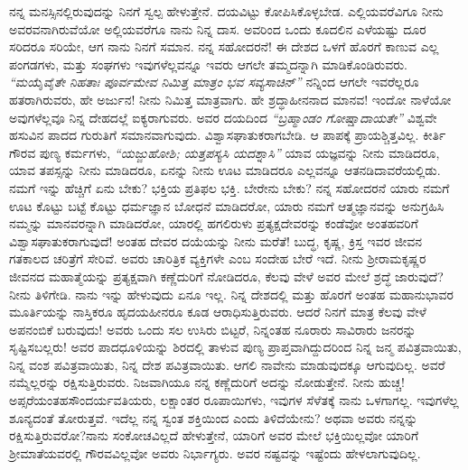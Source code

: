 ನನ್ನ ಮನಸ್ಸಿನಲ್ಲಿರುವುದನ್ನು ನಿನಗೆ ಸ್ವಲ್ಪ ಹೇಳುತ್ತೇನೆ. ದಯವಿಟ್ಟು ಕೋಪಿಸಿಕೊಳ್ಳಬೇಡ. ಎಲ್ಲಿಯವರೆವಿಗೂ ನೀನು ಅವರವನಾಗಿರುವೆಯೋ ಅಲ್ಲಿಯವರೆಗೂ ನಾನು ನಿನ್ನ ದಾಸ. ಅವರಿಂದ ಒಂದು ಕೂದಲಿನ ಎಳೆಯಷ್ಟು ದೂರ ಸರಿದರೂ ಸರಿಯೇ, ಆಗ ನಾನು ನಿನಗೆ ಸಮಾನ. ನನ್ನ ಸಹೋದರನೆ! ಈ ದೇಶದ ಒಳಗೆ ಹೊರಗೆ ಕಾಣುವ ಎಲ್ಲ ಪಂಗಡಗಳು, ಮತ್ತು ಸಂಘಗಳು ಇವುಗಳೆಲ್ಲವನ್ನೂ ಇವರು ಆಗಲೇ ತಮ್ಮದನ್ನಾಗಿ ಮಾಡಿಕೊಂಡಿರುವರು. \textit{ “ಮಯೈವೈತೇ ನಿಹತಾಃ ಪೂರ್ವಮೇವ ನಿಮಿತ್ತ ಮಾತ್ರಂ ಭವ ಸವ್ಯಸಾಚಿನ್” }\enginline{-} ನನ್ನಿಂದ ಆಗಲೇ ಇವರೆಲ್ಲರೂ ಹತರಾಗಿರುವರು, ಹೇ ಅರ್ಜುನ! ನೀನು ನಿಮಿತ್ತ ಮಾತ್ರವಾಗು. ಹೇ ಶ್ರದ್ಧಾಹೀನನಾದ ಮಾನವ! ಇಂದೋ ನಾಳೆಯೋ ಅವುಗಳೆಲ್ಲವೂ ನಿನ್ನ ದೇಹದಲ್ಲೆ ಐಕ್ಯರಾಗುವರು. ಅವರ ದಯದಿಂದ \textit{ “ಬ್ರಹ್ಮಾಂಡಂ ಗೋಷ್ಷಾದಾಯತೇ” } \enginline{-} ವಿಶ್ವವೇ ಹಸುವಿನ ಪಾದದ ಗುರುತಿಗೆ ಸಮಾನವಾಗುವುದು. ವಿಶ್ವಾಸಘಾತುಕರಾಗಬೇಡಿ. ಆ ಪಾಪಕ್ಕೆ ಪ್ರಾಯಶ್ಚಿತ್ತವಿಲ್ಲ. ಕೀರ್ತಿ ಗೌರವ ಪುಣ್ಯ ಕರ್ಮಗಳು, \textit{ “ಯಜ್ಜುಹೋಶಿ; ಯತ್ತಪಸ್ಯಸಿ ಯದಶ್ನಾಸಿ” }ಯಾವ ಯಜ್ಞವನ್ನು ನೀನು ಮಾಡಿದರೂ, ಯಾವ ತಪಸ್ಸನ್ನು ನೀನು ಮಾಡಿದರೂ, ಏನನ್ನು ನೀನು ಊಟ ಮಾಡಿದರೂ ಎಲ್ಲವನ್ನೂ ಆತನಡಿದಾವರೆಯಲ್ಲಿಡು. ನಮಗೆ ಇನ್ನು ಹೆಚ್ಚಿಗೆ ಏನು ಬೇಕು? ಭಕ್ತಿಯ ಪ್ರತಿಫಲ ಭಕ್ತಿ. ಬೇರೇನು ಬೇಕು? ನನ್ನ ಸಹೋದರನೆ ಯಾರು ನಮಗೆ ಊಟ ಕೊಟ್ಟು ಬಟ್ಟೆ ಕೊಟ್ಟು ಧರ್ಮಜ್ಞಾನ ಬೋಧನೆ ಮಾಡಿದರೋ, ಯಾರು ನಮಗೆ ಆತ್ಮಜ್ಞಾನವನ್ನು ಅನುಗ್ರಹಿಸಿ ನಮ್ಮನ್ನು ಮಾನವರನ್ನಾಗಿ ಮಾಡಿದರೋ, ಯಾರಲ್ಲಿ ಹಗಲಿರುಳು ಪ್ರತ್ಯಕ್ಷದೇವರನ್ನು ಕಂಡೆವೋ ಅಂತಹವರಿಗೆ ವಿಶ್ವಾಸಘಾತುಕರಾಗುವುದೆ! ಅಂತಹ ದೇವರ ದಯೆಯನ್ನು ನೀನು ಮರೆತೆ! ಬುದ್ಧ, ಕೃಷ್ಣ, ಕ್ರಿಸ್ತ ಇವರ ಜೀವನ ಗತಕಾಲದ ಚರಿತ್ರೆಗೆ ಸೇರಿವೆ. ಅವರು ಚಾರಿತ್ರಿಕ ವ್ಯಕ್ತಿಗಳೇ ಎಂಬ ಸಂದೇಹ ಬೇರೆ ಇದೆ. ನೀನು ಶ‍್ರೀರಾಮಕೃಷ್ಣರ ಜೀವನದ ಮಹಾತ್ಮೆಯನ್ನು ಪ್ರತ್ಯಕ್ಷವಾಗಿ ಕಣ್ಣೆದುರಿಗೆ ನೋಡಿದರೂ, ಕೆಲವು ವೇಳೆ ಅವರ ಮೇಲೆ ಶ್ರದ್ಧೆ ಜಾರುವುದೆ? ನೀನು ತಿಳಿಗೇಡಿ. ನಾನು ಇನ್ನು ಹೇಳುವುದು ಏನೂ ಇಲ್ಲ. ನಿನ್ನ ದೇಶದಲ್ಲಿ ಮತ್ತು ಹೊರಗೆ ಅಂತಹ ಮಹಾನುಭಾವರ ಮೂರ್ತಿಯನ್ನು ನಾಸ್ತಿಕರೂ ಹೃದಯಹೀನರೂ ಕೂಡ ಆರಾಧಿಸುತ್ತಿರುವರು. ಆದರೆ ನಿನಗೆ ಮಾತ್ರ ಕೆಲವು ವೇಳೆ ಅಪನಂಬಿಕೆ ಬರುವುದು! ಅವರು ಒಂದು ಸಲ ಉಸಿರು ಬಿಟ್ಟರೆ, ನಿನ್ನಂತಹ ನೂರಾರು ಸಾವಿರಾರು ಜನರನ್ನು ಸೃಷ್ಟಿಸಬಲ್ಲರು! ಅವರ ಪಾದಧೂಳಿಯನ್ನು ಶಿರದಲ್ಲಿ ತಾಳುವ ಪುಣ್ಯ ಪ್ರಾಪ್ತವಾಗಿದ್ದುದರಿಂದ ನಿನ್ನ ಜನ್ಮ ಪವಿತ್ರವಾಯಿತು, ನಿನ್ನ ವಂಶ ಪವಿತ್ರವಾಯಿತು, ನಿನ್ನ ದೇಶ ಪವಿತ್ರವಾಯಿತು. ಆಗಲಿ ನಾವೇನು ಮಾಡುವುದಕ್ಕೂ ಆಗುವುದಿಲ್ಲ. ಅವರೆ ನಮ್ಮೆಲ್ಲರನ್ನು ರಕ್ಷಿಸುತ್ತಿರುವರು. ನಿಜವಾಗಿಯೂ ನನ್ನ ಕಣ್ಣೆದುರಿಗೆ ಅದನ್ನು ನೋಡುತ್ತೇನೆ. ನೀನು ಹುಚ್ಚ! ಅಪ್ಸರೆಯಂತಹ\break ಸೌಂದರ್ಯವತಿಯರು, ಲಕ್ಷಾಂತರ ರೂಪಾಯಿಗಳು, ಇವುಗಳ ಸೆಳೆತಕ್ಕೆ ನಾನು ಒಳಗಾಗಲ್ಲ. ಇವುಗಳೆಲ್ಲ ಶೂನ್ಯದಂತೆ ತೋರುತ್ತವೆ. ಇದೆಲ್ಲ ನನ್ನ ಸ್ವಂತ ಶಕ್ತಿಯಿಂದ ಎಂದು ತಿಳಿದೆಯೇನು? ಅಥವಾ ಅವರು ನನ್ನನ್ನು ರಕ್ಷಿಸುತ್ತಿರುವರೋ?ನಾನು ಸಂಕೋಚವಿಲ್ಲದೆ ಹೇಳುತ್ತೇನೆ, ಯಾರಿಗೆ ಅವರ ಮೇಲೆ ಭಕ್ತಿಯಿಲ್ಲವೋ ಯಾರಿಗೆ ಶ‍್ರೀಮಾತೆಯವರಲ್ಲಿ ಗೌರವವಿಲ್ಲವೋ ಅವರು ನಿರ್ಭಾಗ್ಯರು. ಅವರ ನಷ್ಟವನ್ನು ಇಷ್ಟೆಂದು ಹೇಳಲಾಗುವುದಿಲ್ಲ.

